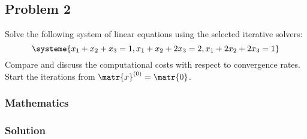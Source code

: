 \subsection{Problem 2}%
\label{sec:problem_2}
Solve the following system of linear equations using the selected iterative solvers:
\begin{equation*}
  \systeme{x_1+x_2+x_3=1,x_1+x_2+2x_3=2,x_1+2x_2+2x_3=1}
\end{equation*}
Compare and discuss the computational costs with respect to convergence rates.
Start the iterations from $\matr{x}^{(0)}=\matr{0}$.
\subsubsection*{Mathematics}
\subsubsection*{Solution}
